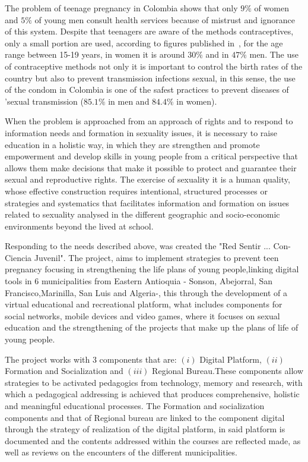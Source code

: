 \documentclass[journal,transmag]{IEEEtran}
\begin{document}
The problem of teenage pregnancy in Colombia shows that only $9\%$ of women and $5\%$ of young men consult health services because of mistrust and ignorance of this system. Despite that teenagers are aware of the methods contraceptives, only a small portion are used, according to figures published in~\cite{Pro2015II}, for the age range between 15-19 years, in women it is around $30\%$ and in $47\%$ men. The use of contraceptive methods not only it is important to control the birth rates of the country but also to prevent transmission infections sexual, in this sense, the use of the condom in Colombia is one of the safest practices to prevent diseases of 'sexual transmission ($85.1\%$ in men and $84.4\%$ in women).
 
When the problem is approached from an approach of rights and to respond to information needs and formation in sexuality issues, it is necessary to raise education in a holistic way, in which they are strengthen and promote empowerment and develop skills in young people from a critical perspective that allows them make decisions that make it possible to protect and guarantee their sexual and reproductive rights. The exercise of sexuality it is a human quality, whose effective construction requires intentional, structured processes or strategies and systematics that facilitates information and formation on issues related to sexuality analysed in the different geographic and socio-economic environments beyond the lived at school.

Responding to the needs described above, was created the "Red Sentir ... Con-Ciencia Juvenil". The project, aims to implement strategies to prevent teen pregnancy focusing in strengthening the life plans of young people,linking digital tools in 6 municipalities from Eastern Antioquia - Sonson, Abejorral, San Francisco,Marinilla, San Luis and Algeria-, this through the development of a virtual educational and recreational platform, what includes components for social networks, mobile devices and video games, where it focuses on sexual education and the strengthening of the projects that make up the plans of life of young people.

The project works with 3 components that are: $(i)$ Digital Platform, $(ii)$ Formation and Socialization and $(iii)$ Regional Bureau.These components allow strategies to be activated pedagogics from technology, memory and research, with which a pedagogical addressing is achieved that produces comprehensive, holistic and meaningful educational processes. The Formation and socialization components and that of Regional bureau are linked to the component digital through the strategy of realization of the digital platform, in said platform is documented and the contents addressed within the courses are reflected made, as well as reviews on the encounters of the different municipalities. 
\end{document}
